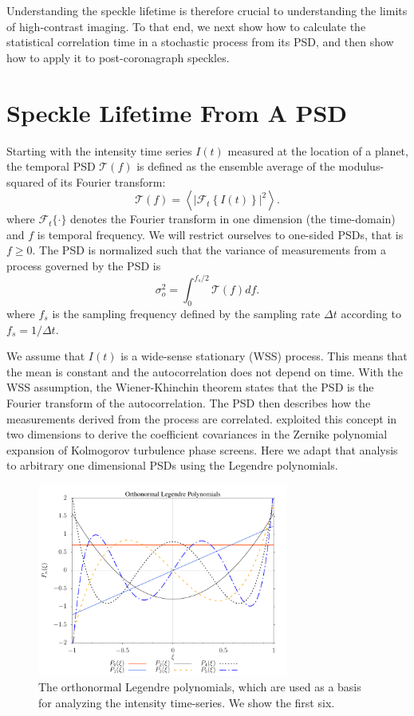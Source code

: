 \documentclass[10pt,preprint]{aastex631}
\begin{document}
Understanding the speckle lifetime is therefore crucial to understanding the limits of high-contrast imaging.  To that end, we next show how to calculate the statistical correlation time in a stochastic process from its PSD, and then show how to apply it to post-coronagraph speckles.


\section{Speckle Lifetime From A PSD}
\label{sec:psd_lifetime}
Starting with the intensity time series $I(t)$ measured at the location of a planet, the temporal PSD $\mathcal{T}(f)$ is defined as the ensemble average of the modulus-squared of its Fourier transform:
\begin{equation}
\mathcal{T}(f) = \left\langle \left| \mathcal{F}_t \left\{ I(t) \right\} \right|^2 \right\rangle.
\label{eqn:psd_def}
\end{equation}
where $\mathcal{F}_t\{\cdot\}$ denotes the Fourier transform in one dimension (the time-domain) and $f$ is temporal frequency.  We will restrict ourselves to one-sided PSDs, that is $f \ge 0$.  The PSD is normalized such that the variance of measurements from a process governed by the PSD is
\begin{equation}
\sigma_o^2 = \int_{0}^{f_s/2} \mathcal{T}(f) df.
\label{eqn:process_var}
\end{equation}
where $f_s$ is the sampling frequency defined by the sampling rate $\Delta t$ according to $f_s = 1/\Delta t$.

We assume that $I(t)$ is a wide-sense stationary (WSS) process.  This means that the mean is constant and the autocorrelation does not depend on time.  With the WSS assumption, the Wiener-Khinchin theorem states that the PSD is the Fourier transform of the autocorrelation.  The PSD then describes how the measurements derived from the process are correlated. \citet{1976JOSA...66..207N} exploited this concept in two dimensions to derive the coefficient covariances in the Zernike polynomial expansion of Kolmogorov turbulence phase screens.  Here we adapt that analysis to arbitrary one dimensional PSDs using the Legendre polynomials.  

\begin{figure}[h]
    \centering
    \includegraphics[width=3.25in]{onLegPol.pdf}
    \caption{The orthonormal Legendre polynomials, which are used as a basis for analyzing the intensity time-series.  We show the first six. \label{fig:onlegpol}}
\end{figure}
\end{document}
